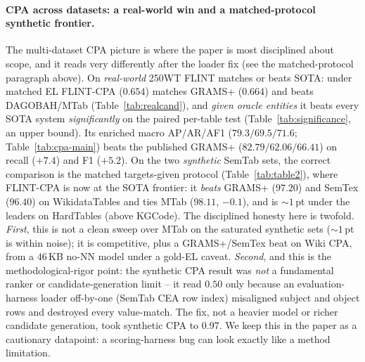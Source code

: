 \paragraph{CPA across datasets: a real-world win and a matched-protocol synthetic frontier.}
The multi-dataset CPA picture is where the paper is most disciplined about scope, and it
reads very differently after the loader fix (see the matched-protocol paragraph above).
On \emph{real-world} 250WT FLINT matches or beats SOTA: under matched EL FLINT-CPA
($0.654$) matches GRAMS+ ($0.664$) and beats DAGOBAH/MTab (Table~\ref{tab:realcand}), and
\emph{given oracle entities} it beats every SOTA system \emph{significantly} on the paired
per-table test (Table~\ref{tab:significance}, an upper bound). Its
enriched macro AP/AR/AF1 ($79.3/69.5/71.6$; Table~\ref{tab:cpa-main}) beats the published
GRAMS+ ($82.79/62.06/66.41$) on recall ($+7.4$) and F1 ($+5.2$). On the two
\emph{synthetic} SemTab sets, the correct comparison is the matched targets-given
protocol (Table~\ref{tab:table2}), where FLINT-CPA is now at the SOTA frontier: it
\emph{beats} GRAMS+ ($97.20$) and SemTex ($96.40$) on WikidataTables and ties MTab
($98.11$, $-0.1$), and is $\sim$$1$\,pt under the leaders on HardTables (above KGCode).
The disciplined honesty here is twofold. \emph{First}, this is not a clean sweep over
MTab on the saturated synthetic sets ($\sim$$1$\,pt is within noise); it is competitive,
plus a GRAMS+/SemTex beat on Wiki CPA, from a $46$\,KB no-NN model under a gold-EL
caveat. \emph{Second}, and this is the methodological-rigor point: the synthetic CPA
result was \emph{not} a fundamental ranker or candidate-generation limit -- it read
$0.50$ only because an evaluation-harness loader off-by-one (SemTab CEA row index)
misaligned subject and object rows and destroyed every value-match. The fix, not a
heavier model or richer candidate generation, took synthetic CPA to $0.97$. We keep this
in the paper as a cautionary datapoint: a scoring-harness bug can look exactly like a
method limitation.

